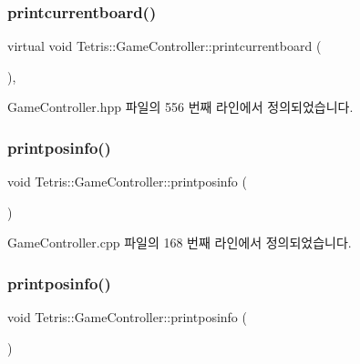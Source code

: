 \subsubsection{\texorpdfstring{printcurrentboard()}{printcurrentboard()}\hspace{0.1cm}{\footnotesize\ttfamily [2/2]}}
{\footnotesize\ttfamily virtual void Tetris\+::\+Game\+Controller\+::printcurrentboard (\begin{DoxyParamCaption}{ }\end{DoxyParamCaption})\hspace{0.3cm}{\ttfamily [inline]}, {\ttfamily [virtual]}}



Game\+Controller.\+hpp 파일의 556 번째 라인에서 정의되었습니다.

\mbox{\label{class_tetris_1_1_game_controller_a269da7d33475ae2f327ee9a51f02ef52}} 
\subsubsection{\texorpdfstring{printposinfo()}{printposinfo()}\hspace{0.1cm}{\footnotesize\ttfamily [1/2]}}
{\footnotesize\ttfamily void Tetris\+::\+Game\+Controller\+::printposinfo (\begin{DoxyParamCaption}{ }\end{DoxyParamCaption})}



Game\+Controller.\+cpp 파일의 168 번째 라인에서 정의되었습니다.

\mbox{\label{class_tetris_1_1_game_controller_a269da7d33475ae2f327ee9a51f02ef52}} 
\subsubsection{\texorpdfstring{printposinfo()}{printposinfo()}\hspace{0.1cm}{\footnotesize\ttfamily [2/2]}}
{\footnotesize\ttfamily void Tetris\+::\+Game\+Controller\+::printposinfo (\begin{DoxyParamCaption}{ }\end{DoxyParamCaption})\hspace{0.3cm}{\ttfamily [inline]}}



